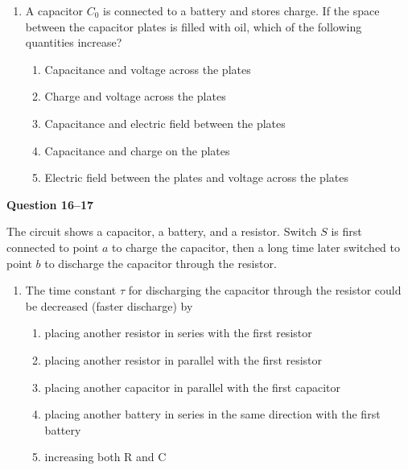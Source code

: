 \documentclass{../../../oss-apphys}
\begin{document}
\begin{multicols}{2}
\begin{enumerate}[leftmargin=18pt,resume]
  \item A capacitor $C_0$ is connected to a battery and stores charge. If the
    space between the capacitor plates is filled with oil, which of the
    following quantities increase?
    \begin{enumerate}[noitemsep,topsep=0pt,leftmargin=18pt,label=(\Alph*)]
    \item Capacitance and voltage across the plates
    \item Charge and voltage across the plates
    \item Capacitance and electric field between the plates
    \item Capacitance and charge on the plates
    \item Electric field between the plates and voltage across the plates
    \end{enumerate}
  \end{enumerate}

  \columnbreak
  
  \textbf{Question 16--17}
  
  The circuit shows a capacitor, a battery, and a resistor. Switch $S$ is first
  connected to point $a$ to charge the capacitor, then a long time later
  switched to point $b$ to discharge the capacitor through the resistor.
  \begin{center}
  \end{center}
  
  \begin{enumerate}[leftmargin=18pt,resume]
  \item The time constant $\tau$ for discharging the capacitor through the
    resistor could be decreased (faster discharge) by
    \begin{enumerate}[noitemsep,topsep=0pt,leftmargin=18pt,label=(\Alph*)]
    \item placing another resistor in series with the first resistor
    \item placing another resistor in parallel with the first resistor
    \item placing another capacitor in parallel with the first capacitor
    \item placing another battery in series in the same direction with the
      first battery
    \item increasing both R and C
    \end{enumerate}


\end{enumerate}
\end{multicols}
\end{document}
